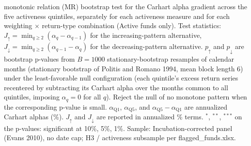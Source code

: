 \begin{table}[!htbp]
\begin{minipage}{\tabletempwidth}
\begin{singlespace}
\textcite{PattonTimmermann2010} monotonic relation (MR) bootstrap test for the Carhart alpha gradient across the five activeness quintiles, separately for each activeness measure and for each weighting $\times$ return-type combination (Active funds only). Test statistics: $J_{\uparrow} = \min_{q \geq 2}(\alpha_q - \alpha_{q-1})$ for the increasing-pattern alternative, $J_{\downarrow} = \min_{q \geq 2}(\alpha_{q-1} - \alpha_q)$ for the decreasing-pattern alternative. $p_{\uparrow}$ and $p_{\downarrow}$ are bootstrap p-values from $B = 1000$ stationary-bootstrap resamples of calendar months (stationary bootstrap of Politis and Romano 1994, mean block length 6) under the least-favorable null configuration (each quintile's excess return series recentered by subtracting its Carhart alpha over the months common to all quintiles, imposing $\alpha_q = 0$ for all $q$). Reject the null of no monotone pattern when the corresponding p-value is small. $\alpha_{\text{Q1}}$, $\alpha_{\text{Q5}}$, and $\alpha_{\text{Q5}}-\alpha_{\text{Q1}}$ are annualized Carhart alphas (\%). $J_{\uparrow}$ and $J_{\downarrow}$ are reported in annualized \% terms. $^{*}$, $^{**}$, $^{***}$ on the p-values: significant at 10\%, 5\%, 1\%. Sample: Incubation-corrected panel (Evans 2010), no date cap; H3 / activeness subsample per flagged\_funds.xlsx.
\end{singlespace}
\end{minipage}
\end{table}

